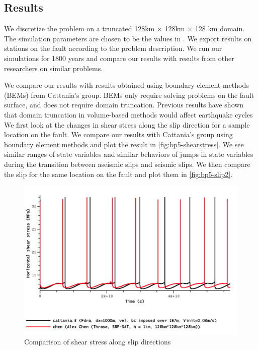 \subsection{Results}
We discretize the problem on a truncated 128km $\times$ 128km $\times$ 128 km domain. The simulation parameters are chosen to be the values in \citep{jiang2020seas}. 
We export results on stations on the fault according to the problem description. We run our simulations for 1800 years and compare our results with results from other researchers on similar problems.

We compare our results with results obtained using boundary element methods (BEMs) from Cattania's group. BEMs only require solving problems on the fault surface, and does not require domain truncation. Previous results have shown that domain truncation in volume-based methods would affect earthquake cycles
We first look at the changes in shear stress along the slip direction for a sample location on the fault. We compare our results with Cattania's group using boundary element methods and plot the result in \autoref{fig:bp5-shearstress}. We see similar ranges of state variables and similar behaviors of jumps in state variables during the transition between aseismic slips and seismic slips. We then compare the slip for the same location on the fault and plot them in \autoref{fig:bp5-slip2}.

\begin{figure}
    \centering
    \includegraphics[width=\linewidth]{figures/sample-shearstress.png}
    \caption{Comparison of shear stress along slip directions}
    \label{fig:bp5-shearstress}
\end{figure}

